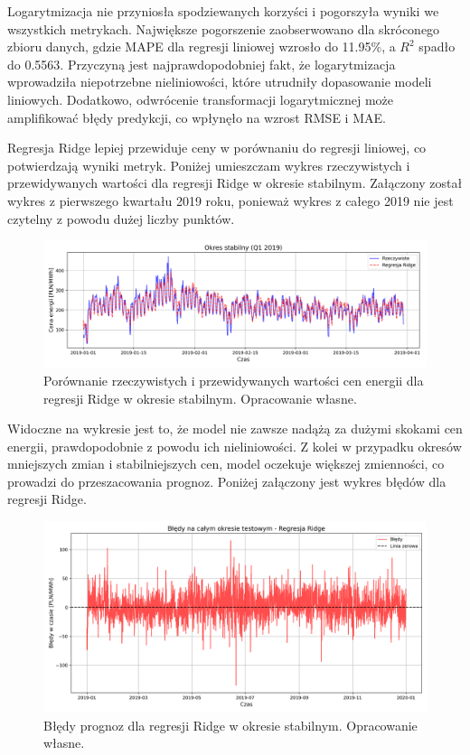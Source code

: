 Logarytmizacja nie przyniosła spodziewanych korzyści i pogorszyła wyniki we wszystkich metrykach. Największe pogorszenie zaobserwowano dla skróconego zbioru danych, gdzie MAPE dla regresji liniowej wzrosło do 11.95\%, a \(R^2\) spadło do 0.5563. Przyczyną jest najprawdopodobniej fakt, że logarytmizacja wprowadziła niepotrzebne nieliniowości, które utrudniły dopasowanie modeli liniowych. Dodatkowo, odwrócenie transformacji logarytmicznej może amplifikować błędy predykcji, co wpłynęło na wzrost RMSE i MAE.

Regresja Ridge lepiej przewiduje ceny w porównaniu do regresji liniowej, co potwierdzają wyniki metryk. Poniżej umieszczam wykres rzeczywistych i przewidywanych wartości dla regresji Ridge w okresie stabilnym. Załączony został wykres z pierwszego kwartału 2019 roku, ponieważ wykres z całego 2019 nie jest czytelny z powodu dużej liczby punktów.

\begin{figure}[H]
    \centering
    \includegraphics[width=1.0\textwidth]{../../plots/predicts/ridge_predictions_full_q1_2019.png}
    \caption{Porównanie rzeczywistych i przewidywanych wartości cen energii dla regresji Ridge w okresie stabilnym. Opracowanie własne.}
    \label{fig:ridge_predictions_full_stable_period}
\end{figure}

Widoczne na wykresie jest to, że model nie zawsze nadążą za dużymi skokami cen energii, prawdopodobnie z powodu ich nieliniowości. Z kolei w przypadku okresów mniejszych zmian i stabilniejszych cen, model oczekuje większej zmienności, co prowadzi do przeszacowania prognoz. Poniżej załączony jest wykres błędów dla regresji Ridge.

\begin{figure}[H]
    \centering
    \includegraphics[width=1.0\textwidth]{../../plots/predicts/errors_over_time_Ridge_full_stable_period.png}
    \caption{Błędy prognoz dla regresji Ridge w okresie stabilnym. Opracowanie własne.}
    \label{fig:ridge_errors_full_stable_period}
\end{figure}

